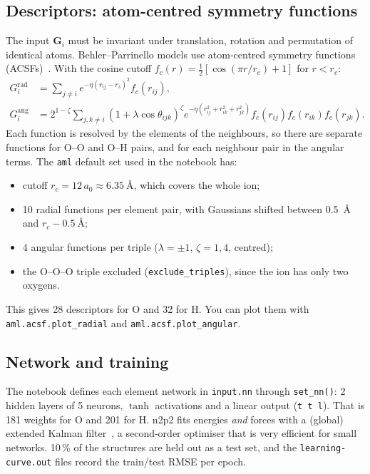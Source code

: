 \documentclass[11pt,a4paper]{article}
\begin{document}
\subsection{Descriptors: atom-centred symmetry functions}
The input $\mathbf G_i$ must be invariant under translation, rotation and
permutation of identical atoms. Behler--Parrinello models use
atom-centred symmetry functions (ACSFs)~\cite{Behler2011}. With the cosine
cutoff $f_c(r) = \tfrac12\left[\cos(\pi r/r_c)+1\right]$ for $r<r_c$:
\begin{align}
  G^{\mathrm{rad}}_i &= \sum_{j\neq i} e^{-\eta (r_{ij}-r_s)^2} f_c(r_{ij}),\\
  G^{\mathrm{ang}}_i &= 2^{1-\zeta}\sum_{j,k\neq i}
     \left(1+\lambda\cos\theta_{ijk}\right)^{\zeta}
     e^{-\eta(r_{ij}^2+r_{ik}^2+r_{jk}^2)}
     f_c(r_{ij})f_c(r_{ik})f_c(r_{jk}).
\end{align}
Each function is resolved by the elements of the neighbours, so there are
separate functions for O--O and O--H pairs, and for each neighbour pair in the
angular terms. The \texttt{aml} default set used in the notebook has:
\begin{itemize}[nosep]
  \item cutoff $r_c = 12\,a_0 \approx \SI{6.35}{\angstrom}$, which covers the whole ion;
  \item 10 radial functions per element pair, with Gaussians shifted between
        \SI{0.5}{\angstrom} and $r_c-\SI{0.5}{\angstrom}$;
  \item 4 angular functions per triple ($\lambda=\pm1$, $\zeta=1,4$, centred);
  \item the O--O--O triple excluded (\texttt{exclude\_triples}), since the ion has only two oxygens.
\end{itemize}
This gives 28 descriptors for O and 32 for H. You can plot them
with
\texttt{aml.acsf.plot\_radial} and \texttt{aml.acsf.plot\_angular}.

\subsection{Network and training}
The notebook defines each element network in \texttt{input.nn} through
\texttt{set\_nn()}: 2 hidden layers of 5 neurons, $\tanh$ activations and a
linear output (\texttt{t t l}). That is 181 weights for O and 201 for H.
n2p2 fits energies \emph{and} forces with a (global) extended Kalman
filter~\cite{Singraber2019b}, a second-order optimiser that is very efficient
for small networks. 10\,\% of the structures are held out as a test set, and
the \texttt{learning-curve.out} files record the train/test RMSE per epoch.
\end{document}
